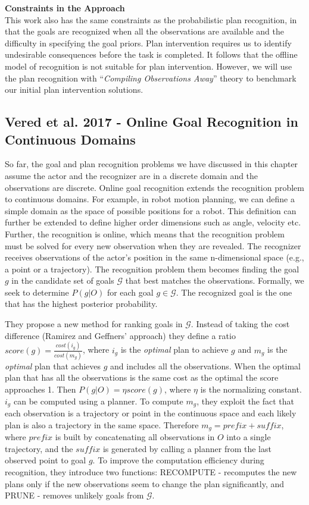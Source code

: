 \noindent\textbf{Constraints in the Approach}\\
This work also has the same constraints as the probabilistic plan recognition, in that the goals are recognized when all the observations are available and the difficulty in specifying the goal priors. Plan intervention requires us to identify undesirable consequences before the task is completed. It follows that the offline model of recognition is not suitable for plan intervention. However, we will use the plan recognition with ``\textit{Compiling Observations Away}'' theory to benchmark our initial plan intervention solutions.


\subsection{Vered et al. 2017 - Online Goal Recognition in Continuous Domains}
So far, the goal and plan recognition problems we have discussed in this chapter assume the actor and the recognizer are in a discrete domain and the observations are discrete. Online goal recognition \cite{vered2017} extends the recognition problem to continuous domains. For example, in robot motion planning, we can define a simple domain as the space of possible positions for a robot. This definition can further be extended to define higher order dimensions such as angle, velocity etc. Further, the recognition is online, which means that the recognition problem must be solved for every new observation when they are revealed. The recognizer receives observations of the actor's position in the same n-dimensional space (e.g., a point or a trajectory). The recognition problem them becomes finding the goal $g$ in the candidate set of goals $\mathcal{G}$ that best matches the observations. Formally, we seek to determine $P(g|O)$ for each goal $g\in \mathcal{G}$. The recognized goal is the one that has the highest posterior probability.

They propose a new method for ranking goals in $\mathcal{G}$. Instead of taking the cost difference (Ramirez and Geffners' approach) they define a ratio $score(g)=\frac{cost(i_g)}{cost(m_g)}$, where $i_g$ is the \textit{optimal} plan to achieve $g$ and $m_g$ is the \textit{optimal} plan that achieves $g$ and includes all the observations. When the optimal plan that has all the observations is the same cost as the optimal the score approaches 1. Then $P(g|O) = \eta score(g)$, where $\eta$ is the normalizing constant. $i_g$ can be computed using a planner. To compute $m_g$, they exploit the fact that each observation is a trajectory or point in the continuous space and each likely plan is also a trajectory in the same space. Therefore $m_g= prefix + suffix$, where $prefix$ is built by concatenating all observations in $O$ into a single trajectory, and the $suffix$ is generated by calling a planner from the last observed point to goal $g$. To improve the computation efficiency during recognition, they introduce two functions: RECOMPUTE - recomputes the new plans only if the new observations seem to change the plan significantly, and PRUNE - removes unlikely goals from $\mathcal{G}$.


